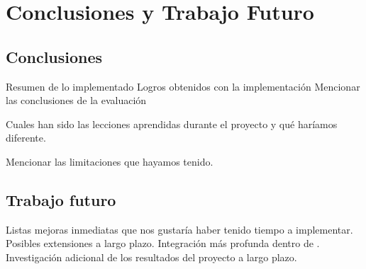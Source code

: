 \chapter{Conclusiones y Trabajo Futuro}
\label{cap:conclusiones}

\section{Conclusiones}
Resumen de lo implementado
Logros obtenidos con la implementación
Mencionar las conclusiones de la evaluación 

Cuales han sido las lecciones aprendidas durante el proyecto y qué haríamos diferente.

Mencionar las limitaciones que hayamos tenido.

\section{Trabajo futuro}
Listas mejoras inmediatas que nos gustaría haber tenido tiempo a implementar.
Posibles extensiones a largo plazo.
Integración más profunda dentro de \aer.
Investigación adicional de los resultados del proyecto a largo plazo.